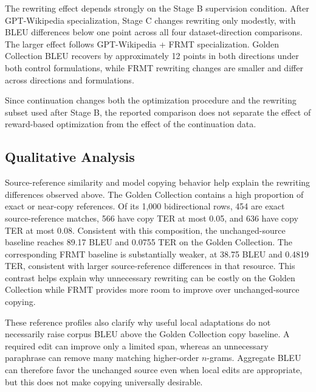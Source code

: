 \documentclass[acmtog,nonacm]{acmart}
\begin{document}
The rewriting effect depends strongly on the Stage B supervision condition.
After GPT-Wikipedia specialization, Stage C changes rewriting only modestly,
with BLEU differences below one point across all four dataset-direction
comparisons. The larger effect follows GPT-Wikipedia + FRMT specialization.
Golden Collection BLEU recovers by approximately 12 points in both
directions under both control formulations, while FRMT rewriting changes are
smaller and differ across directions and formulations.

Since continuation
changes both the optimization procedure and the rewriting subset used after
Stage B, the reported comparison does not separate the effect of reward-based
optimization from the effect of the continuation data.

\subsection{Qualitative Analysis}
\label{sec:qualitative-analysis}

Source-reference similarity and model copying behavior help explain the
rewriting differences observed above. The
Golden Collection contains a high proportion of exact or near-copy
references. Of its 1,000 bidirectional rows, 454 are exact source-reference
matches, 566 have copy TER at most 0.05, and 636 have copy TER at most 0.08.
Consistent with this composition, the unchanged-source baseline reaches 89.17
BLEU and 0.0755 TER on the Golden Collection. The corresponding FRMT baseline is substantially weaker, at 38.75 BLEU and
0.4819 TER, consistent with larger source-reference differences in that
resource. This contrast helps explain why unnecessary rewriting can be costly on the
Golden Collection while FRMT provides more room to improve over unchanged-source
copying.

These reference profiles also clarify why useful local adaptations do not
necessarily raise corpus BLEU above the Golden Collection copy baseline. A
required edit can improve only a limited span, whereas an unnecessary
paraphrase can remove many matching higher-order \(n\)-grams. Aggregate BLEU
can therefore favor the unchanged source even when local edits are appropriate,
but this does not make copying universally desirable.
\end{document}
